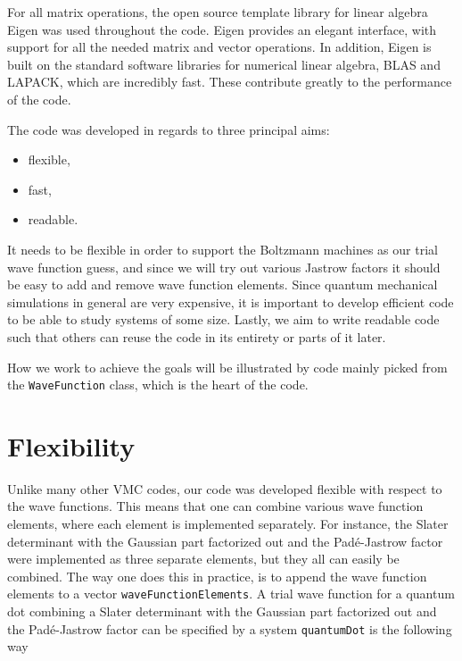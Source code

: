 For all matrix operations, the open source template library for linear algebra Eigen was used throughout the code. Eigen provides an elegant interface, with support for all the needed matrix and vector operations. In addition, Eigen is built on the standard software libraries for numerical linear algebra, BLAS and LAPACK, which are incredibly fast. These contribute greatly to the performance of the code. 

The code was developed in regards to three principal aims:
\begin{center}
	\begin{minipage}{0.2\textwidth}
		\begin{itemize}
			\item flexible,
			\item fast,
			\item readable.
		\end{itemize}
	\end{minipage}
\end{center}
It needs to be flexible in order to support the Boltzmann machines as our trial wave function guess, and since we will try out various Jastrow factors it should be easy to add and remove wave function elements. Since quantum mechanical simulations in general are very expensive, it is important to develop efficient code to be able to study systems of some size. Lastly, we aim to write readable code such that others can reuse the code in its entirety or parts of it later. 

How we work to achieve the goals will be illustrated by code mainly picked from the \lstinline{WaveFunction} class, which is the heart of the code. 

\section{Flexibility}
Unlike many other VMC codes, our code was developed flexible with respect to the wave functions. This means that one can combine various wave function elements, where each element is implemented separately. For instance, the Slater determinant with the Gaussian part factorized out and the Padé-Jastrow factor were implemented as three separate elements, but they all can easily be combined. The way one does this in practice, is to append the wave function elements to a vector \lstinline{waveFunctionElements}. A trial wave function for a quantum dot combining a Slater determinant with the Gaussian part factorized out and the Padé-Jastrow factor can be specified by a system \lstinline{quantumDot} is the following way


